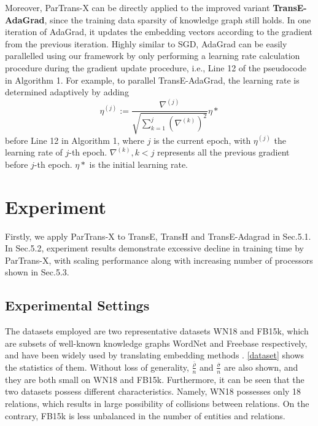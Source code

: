 \documentclass[sigconf]{acmart}
\begin{document}
Moreover, ParTrans-X can be directly applied to the improved variant \textbf{TransE-AdaGrad}, since the training data sparsity of knowledge graph still holds. 
In one iteration of AdaGrad, it updates the embedding vectors according to the gradient from the previous iteration. Highly similar to SGD, AdaGrad can be easily parallelled using our framework by only performing a learning rate calculation procedure during the gradient update procedure, i.e., Line 12 of the pseudocode in Algorithm 1. For example, to parallel TransE-AdaGrad, the learning rate is determined adaptively by adding 
\begin{equation}
\eta^{(j)} := \frac{ \nabla^{(j)}}{\sqrt{\sum_{k=1}^{j} (\nabla^{(k)})^2}}{\eta*}
\end{equation} 
before Line 12 in Algorithm 1, where $j$ is the current epoch, with $\eta^{(j)}$ the learning rate of $j$-th epoch. $\nabla^{(k)},k<j$ represents all the previous gradient before $j$-th epoch. $\eta*$ is the initial learning rate.









 



\section{Experiment}
Firstly, we apply ParTrans-X to TransE, TransH and TransE-Adagrad in Sec.5.1. In Sec.5.2, experiment results demonstrate  excessive decline in training time by ParTrans-X,  with scaling performance along with increasing number of processors shown in Sec.5.3.




\subsection{Experimental Settings}

The datasets employed are two representative datasets WN18 and FB15k, which are subsets of well-known knowledge graphs WordNet and Freebase respectively, and have been widely used by translating embedding methods \cite{bordes2013translating,Wang2014Knowledge,Lin2015Learning,jia2016locally}.  \tablename \ref{dataset} shows the statistics of them. Without loss of generality,  $\frac{\bar{\rho}}{n}$ and $\frac{\bar{\sigma}} {n}$ are also shown, and they are both small on WN18 and FB15k. Furthermore, it can be seen that the two datasets possess different characteristics. Namely, WN18 possesses only 18 relations, which results in large possibility of collisions between relations. 
On the contrary, FB15k is less unbalanced in the number of entities and relations.
\end{document}
